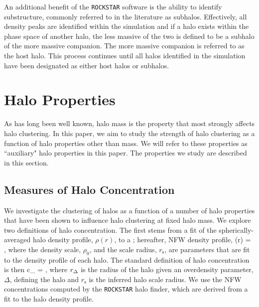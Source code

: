 \documentclass[usenatbib,fleqn]{mnras}
\begin{document}
An additional benefit of the {\tt ROCKSTAR} software is the ability to identify substructure, commonly referred to in the
literature as subhalos. Effectively, all density peaks are identified within the simulation and if a halo exists within the phase
space of another halo, the less massive of the two is defined to be a subhalo of the more massive companion. The more massive companion is 
referred to as the host halo. This process continues until all halos identified in the simulation have been designated as either host halos or subhalos.

\section{Halo Properties}
\label{section:haloprops}

As has long been well known, halo mass is the property that most strongly affects halo clustering. In 
this paper, we aim to study the strength of halo clustering as a function of halo properties other than 
mass. We will refer to these properties as ``auxiliary" halo properties in this paper. The properties 
we study are described in this section.

\subsection{Measures of Halo Concentration}

We investigate the clustering of halos as a function of a number of halo properties 
that have been shown to influence halo clustering at fixed halo mass. We explore 
two definitions of halo concentration. The first stems from a fit of the spherically-averaged 
halo density profile, $\rho(r)$, to a \citet{navarro_etal97}; hereafter, NFW density profile, 
%
\beq
\rho(r) = ,
\eeq
%
where the density scale, $\rho_0$, and the scale radius, $r_{\mathrm{s}}$, are parameters 
that are fit to the density profile of each halo. The standard definition of halo concentration is then 
\beq
c_{} = ,
\eeq
where $r_{\Delta}$ is the radius of the halo given an overdensity parameter, $\Delta$, defining the halo 
and $r_{\mathrm{s}}$ is the inferred halo scale radius. We use the NFW concentrations computed by the 
{\tt ROCKSTAR} halo finder, which are derived from a fit to the halo density profile.  
\end{document}
